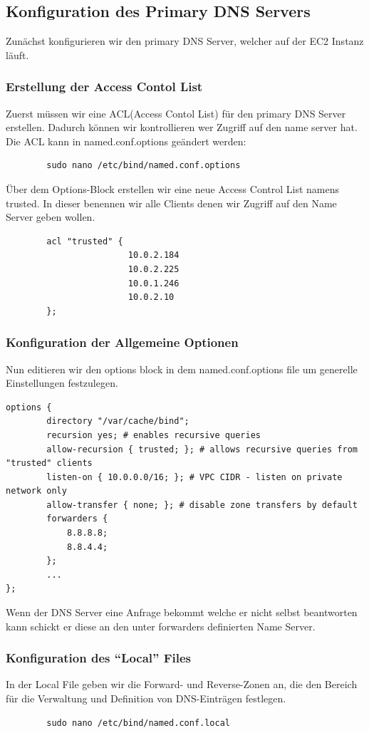 \documentclass[a4paper,12pt]{article}
\begin{document}
\subsection{Konfiguration des Primary DNS Servers}
Zunächst konfigurieren wir den primary DNS Server, welcher auf der EC2 Instanz läuft.

\subsubsection{Erstellung der Access Contol List}
Zuerst müssen wir eine ACL(Access Contol List) für den primary DNS Server erstellen. Dadurch können wir kontrollieren wer Zugriff auf den name server hat.
Die ACL kann in named.conf.options geändert werden:
\begin{verbatim}
		sudo nano /etc/bind/named.conf.options
\end{verbatim}


Über dem Options-Block erstellen wir eine neue Access Control List namens trusted. In dieser benennen wir alle Clients denen wir Zugriff auf den Name Server geben wollen.
\begin{verbatim}
		acl "trusted" {
						10.0.2.184
						10.0.2.225
						10.0.1.246
						10.0.2.10
		};
\end{verbatim}


\subsubsection{Konfiguration der Allgemeine Optionen}
Nun editieren wir den options block in dem named.conf.options file um generelle Einstellungen festzulegen.
\begin{verbatim}
options {
		directory "/var/cache/bind";
		recursion yes; # enables recursive queries
		allow-recursion { trusted; }; # allows recursive queries from "trusted" clients
		listen-on { 10.0.0.0/16; }; # VPC CIDR - listen on private network only
		allow-transfer { none; }; # disable zone transfers by default
		forwarders {
			8.8.8.8;
			8.8.4.4;
		};
		...
};
\end{verbatim}
Wenn der DNS Server eine Anfrage bekommt welche er nicht selbst beantworten kann schickt er diese an den unter forwarders definierten Name Server.


\subsubsection{Konfiguration des “Local” Files}
In der Local File geben wir die Forward- und Reverse-Zonen an, die den Bereich für die Verwaltung und Definition von DNS-Einträgen festlegen.
\begin{verbatim}
		sudo nano /etc/bind/named.conf.local
\end{verbatim}
\end{document}
